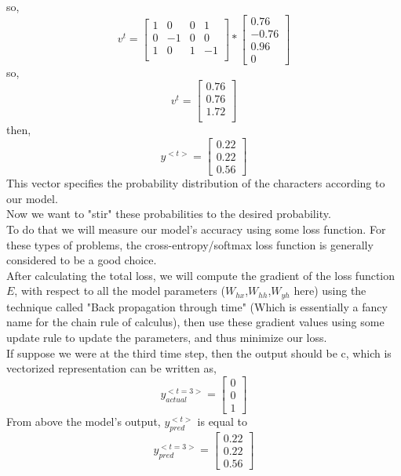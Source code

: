 \documentclass[12pt,letterpaper]{article}
\begin{document}
so,
\[
v^{t} = \begin{bmatrix}
1&0&0&1\\
0&-1&0&0\\
1&0&1&-1\\
\end{bmatrix}*\begin{bmatrix}
0.76\\
-0.76\\
0.96\\
0
\end{bmatrix}
\]
so,
\[
v^{t} = \begin{bmatrix}
0.76\\
0.76\\
1.72\\
\end{bmatrix}
\]
then,
\[
y^{<t>} = \begin{bmatrix}
0.22\\
0.22\\
0.56
\end{bmatrix}
\]
This vector specifies the probability distribution of the characters according to our model.\\
Now we want to "stir" these probabilities to the desired probability.\\ 
To do that we will measure our model's accuracy using some loss function. For these types of problems,
the cross-entropy/softmax loss function is generally considered to be a good choice.\\
After calculating the total loss, we will compute the gradient of the loss function $E$, with respect to all the model parameters ($W_{hx}$,$W_{hh}$,$W_{yh}$ here) using the technique called "Back propagation through time" (Which is essentially a fancy name for the chain rule of calculus), then use these gradient values using some update rule to update the parameters, and thus minimize our loss. 
\\
If suppose we were at the third time step, then the output should be c, which is vectorized representation can be written as,
\[
y_{actual}^{<t=3>} = \begin{bmatrix}
0\\0\\1
\end{bmatrix} 
\]
From above the model's output,
$y_{pred}^{<t>}$ is equal to
\[
y_{pred}^{<t=3>} = \begin{bmatrix}
0.22\\
0.22\\
0.56
\end{bmatrix}
\]
\end{document}
